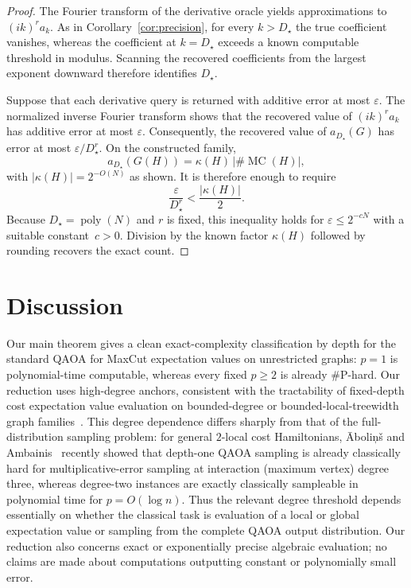 \documentclass[11pt]{article}
\newcommand{\mc}{\operatorname{MC}}
\newcommand{\M}{\#\mc}
\newcommand{\sh}[1]{{#1}}
\begin{document}
\begin{proof}%



The Fourier transform of the derivative oracle %
yields approximations to
\((ik)^r a_k\). As in Corollary~\ref{cor:precision}, for every \(k>D_\star\) the true
coefficient vanishes, whereas the coefficient at \(k=D_\star\) exceeds a
known computable threshold in modulus. Scanning the recovered
coefficients from the largest exponent downward therefore identifies
\(D_\star\).


Suppose that each derivative query is returned with additive error at most
$\varepsilon$.  The normalized inverse Fourier transform shows that the
recovered value of $(ik)^ra_k$ has additive error at most
$\varepsilon$.  Consequently, the recovered value of $a_{D_\star}(G)$ has
error at most
$\varepsilon/D_\star^r$. 
On the constructed family,
\[
  a_{D_\star}(G(H))
  =
  \kappa(H)\,|\M(H)|,
\]
with $|\kappa(H)|=2^{-O(N)}$ as shown. 
It is therefore enough to require
\[
  \frac{\varepsilon}{D_\star^r}
  <
  \frac{|\kappa(H)|}{2}.
\]
Because $D_\star=\operatorname{poly}(N)$ and $r$ is fixed, this inequality
holds for $\varepsilon\le2^{-cN}$ with a suitable constant~$c>0$.
Division by the known factor $\kappa(H)$ followed by rounding recovers the
exact count.
\end{proof}









\section{Discussion} \label{sec:discussion}

Our main theorem gives a clean exact-complexity classification by depth for the standard QAOA for MaxCut
expectation values on unrestricted graphs: $p=1$ is polynomial-time computable, whereas every
fixed $p\geq2$ is already $\#$P-hard.  Our reduction uses high-degree anchors, consistent
with the tractability of fixed-depth cost expectation value evaluation on bounded-degree or bounded-local-treewidth
graph families~\cite{WangEtAl2025}.  
\sh{This degree dependence differs sharply from
that of the full-distribution sampling problem: for general
$2$-local cost %
Hamiltonians, \={A}boli\c{n}\v{s} and
Ambainis~\cite{abolicnvs2026sharp} recently showed that depth-one QAOA
sampling is already classically hard 
for multiplicative-error sampling 
at interaction (maximum vertex) degree three,
whereas degree-two %
instances are exactly classically sampleable in
polynomial time for $p=O(\log n)$}. 
Thus the relevant degree
threshold depends essentially on whether the classical task is
evaluation of a local or global expectation value or sampling from
the complete QAOA output distribution. 
Our reduction also concerns exact or exponentially precise algebraic evaluation; no claims are
made about computations outputting constant or polynomially small error. 
\end{document}

